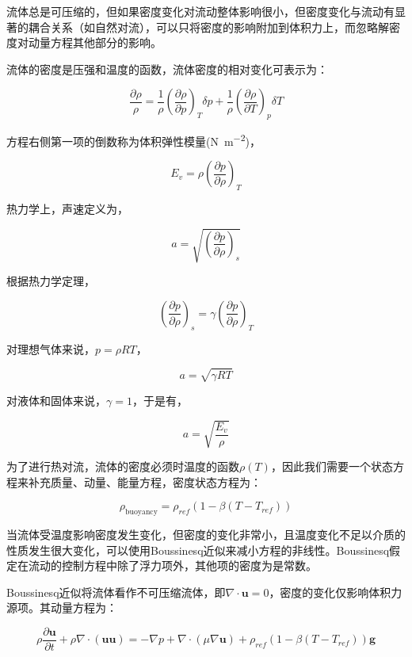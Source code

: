 流体总是可压缩的，但如果密度变化对流动整体影响很小，但密度变化与流动有显著的耦合关系（如自然对流），可以只将密度的影响附加到体积力上，而忽略解密度对动量方程其他部分的影响。

流体的密度是压强和温度的函数，流体密度的相对变化可表示为：

\begin{equation}
\frac{\partial \rho}{\rho} = \frac{1}{\rho}\left(\frac{\partial \rho}{\partial p}\right)_T \delta p + \frac{1}{\rho}\left(\frac{\partial \rho}{\partial T}\right)_p \delta T
\end{equation}

方程右侧第一项的倒数称为体积弹性模量(\si{\newton\per\meter\squared})，

\[E_v = \rho\left(\frac{\partial p}{\partial \rho}\right)_T\]

热力学上，声速定义为，

\[a=\sqrt{\left(\frac{\partial p}{\partial \rho}\right)_s}\]

根据热力学定理，

\[\left(\frac{\partial p}{\partial \rho}\right)_s = \gamma \left(\frac{\partial p}{\partial \rho}\right)_T\]

对理想气体来说，$ p=\rho RT $，

\begin{equation}
a = \sqrt{\gamma RT}
\end{equation}

对液体和固体来说，$ \gamma = 1 $，于是有，

\begin{equation}
a=\sqrt{\frac{E_v}{\rho}}
\end{equation}



为了进行热对流，流体的密度必须时温度的函数$ \rho(T) $，因此我们需要一个状态方程来补充质量、动量、能量方程，密度状态方程为：

\begin{equation}
\rho_{\text{buoyancy}} = \rho_{ref}(1-\beta(T-T_{ref}))
\end{equation}

当流体受温度影响密度发生变化，但密度的变化非常小，且温度变化不足以介质的性质发生很大变化，可以使用Boussinesq近似来减小方程的非线性。Boussinesq假定在流动的控制方程中除了浮力项外，其他项的密度为是常数。

Boussinesq近似将流体看作不可压缩流体，即$ \nabla\cdot\bm{u} = 0 $，密度的变化仅影响体积力源项。其动量方程为：

\begin{equation}
\rho \frac{\partial \bm{u}}{\partial t} + \rho\nabla\cdot(\bm{uu}) = -\nabla p + \nabla\cdot(\mu\nabla\bm{u}) + \rho_{ref}(1-\beta(T-T_{ref}))\bm{g}
\end{equation}

